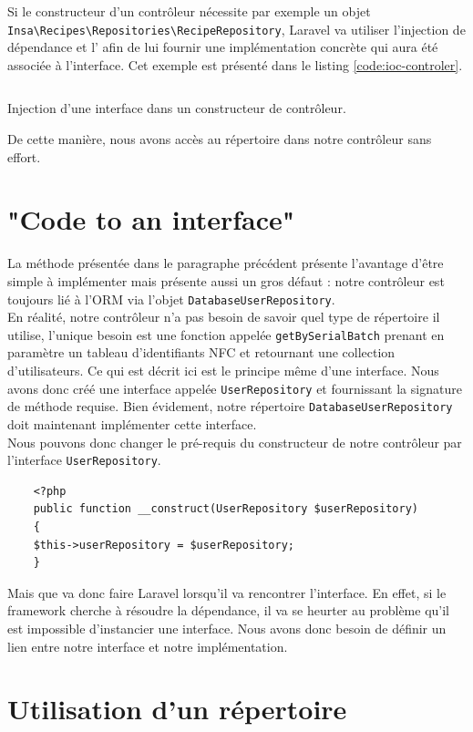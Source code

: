 	Si le constructeur d'un contrôleur nécessite par exemple un objet \verb|Insa\Recipes\Repositories\RecipeRepository|, Laravel va utiliser l'injection de dépendance et l'\ioc{} afin de lui fournir une implémentation concrète qui aura été associée à l'interface. Cet exemple est présenté dans le listing \ref{code:ioc-controler}.
	\begin{listing}[H]
		\inputminted{php}{code/injectionClass.php}
		\caption{Injection d'une interface dans un constructeur de contrôleur.}
		\label{code:ioc-controler}
	\end{listing}

	De cette manière, nous avons accès au répertoire dans notre contrôleur sans effort.

\section{"Code to an interface"}
	La méthode présentée dans le paragraphe précédent présente l'avantage d'être simple à implémenter mais présente aussi un gros défaut : notre contrôleur est toujours lié à l'ORM via l'objet \verb|DatabaseUserRepository|.\\

	En réalité, notre contrôleur n'a pas besoin de savoir quel type de répertoire il utilise, l'unique besoin est une fonction appelée \verb|getBySerialBatch| prenant en paramètre un tableau d'identifiants NFC et retournant une collection d'utilisateurs. Ce qui est décrit ici est le principe même d'une interface. Nous avons donc créé une interface appelée \verb|UserRepository| et fournissant la signature de méthode requise. Bien évidement, notre répertoire \verb|DatabaseUserRepository| doit maintenant implémenter cette interface.\\

	Nous pouvons donc changer le pré-requis du constructeur de notre contrôleur par l'interface \verb|UserRepository|.
	\begin{verbatim}
	<?php
	public function __construct(UserRepository $userRepository)
	{
	$this->userRepository = $userRepository;
	}
	\end{verbatim}

	Mais que va donc faire Laravel lorsqu'il va rencontrer l'interface. En effet, si le framework cherche à résoudre la dépendance, il va se heurter au problème qu'il est impossible d'instancier une interface. Nous avons donc besoin de définir un lien entre notre interface et notre implémentation.

\section{Utilisation d'un répertoire}

